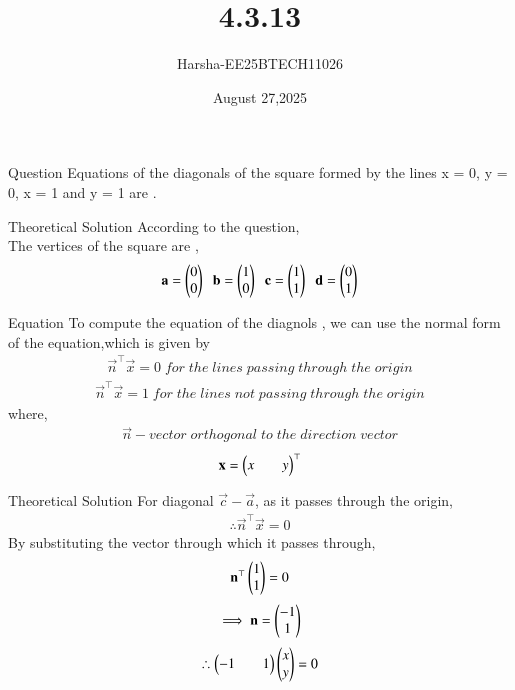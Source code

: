 \documentclass{beamer}
\title %
{4.3.13}
\date{August 27,2025}
\author %
{Harsha-EE25BTECH11026}
\begin{document}
\frame{\titlepage}
\begin{frame}{Question}
Equations of the diagonals of the square formed by the lines x = 0, y = 0, x = 1 and y = 1 are \underline{\hspace{2cm}}.
\end{frame}

\begin{frame}{Theoretical Solution}
According to the question,\\
The vertices of the square are ,
\begin{align}
    \mathbf{a}=\begin{pmatrix}0\\0\end{pmatrix}\;\;\mathbf{b}=\begin{pmatrix}1\\0\end{pmatrix}\;\;\mathbf{c}=\begin{pmatrix}1\\1\end{pmatrix}\;\;\mathbf{d}=\begin{pmatrix}0\\1\end{pmatrix}
\end{align}
\end{frame}

\begin{frame}{Equation}
To compute the equation of the diagnols , we can use the normal form of the equation,which is given by
\begin{align}
    \vec{n}^{\top}\vec{x}=0 \;for \;the \;lines \;passing\;through \;the \;origin
\end{align}
\begin{align}
    \vec{n}^{\top}\vec{x}=1 \;for \;the \;lines \;not \;passing\;through \;the \;origin
\end{align}
where,\\
\begin{align}
    \vec{n}-vector\; orthogonal\; to\; the\; direction\; vector
\end{align}
\begin{align}
    \mathbf{x}=\begin{pmatrix}x&&y\end{pmatrix}^{\top}
\end{align}
\end{frame}

\begin{frame}{Theoretical Solution}
For diagonal $\vec{c}-\vec{a}$, as it passes through the origin,
\begin{align}
    \therefore \vec{n}^{\top}\vec{x}=0
\end{align}
By substituting the vector through which it passes through,
\begin{align}
    \mathbf{n}^{\top}\begin{pmatrix}1\\1\end{pmatrix}=0
\end{align}
\begin{align}
    \implies \mathbf{n}=\begin{pmatrix}-1\\1\end{pmatrix}
\end{align}
\begin{align}
    \therefore \begin{pmatrix}-1&&1\end{pmatrix}\begin{pmatrix}x\\y\end{pmatrix}=0
\end{align}
\end{frame}
\end{document}
